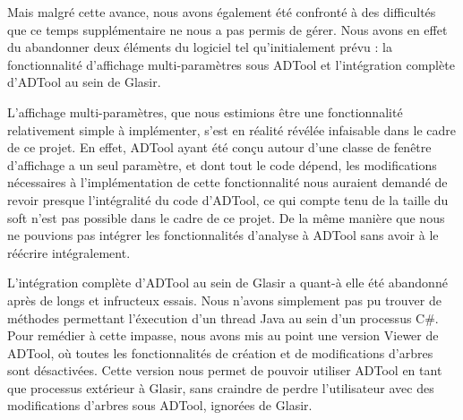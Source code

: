 Mais malgré cette avance, nous avons également été confronté à des difficultés que ce temps supplémentaire ne nous a pas permis de gérer. Nous avons en effet du abandonner deux éléments du logiciel tel qu'initialement prévu : la fonctionnalité d'affichage multi-paramètres sous ADTool et l'intégration complète d'ADTool au sein de Glasir.

L'affichage multi-paramètres, que nous estimions être une fonctionnalité relativement simple à implémenter, s'est en réalité révélée infaisable dans le cadre de ce projet. En effet, ADTool ayant été conçu autour d'une classe de fenêtre d'affichage a un seul paramètre, et dont tout le code dépend, les modifications nécessaires à l'implémentation de cette fonctionnalité nous auraient demandé de revoir presque l'intégralité du code d'ADTool, ce qui compte tenu de la taille du soft n'est pas possible dans le cadre de ce projet. De la même manière que nous ne pouvions pas intégrer les fonctionnalités d'analyse à ADTool sans avoir à le réécrire intégralement.

L'intégration complète d'ADTool au sein de Glasir a quant-à elle été abandonné après de longs et infructeux essais. Nous n'avons simplement pas pu trouver de méthodes permettant l'éxecution d'un thread Java au sein d'un processus C\#. Pour remédier à cette impasse, nous avons mis au point une version \og Viewer \fg de ADTool, où toutes les fonctionnalités de création et de modifications d'arbres sont désactivées. Cette version nous permet de pouvoir utiliser ADTool en tant que processus extérieur à Glasir, sans craindre de perdre l'utilisateur avec des modifications d'arbres sous ADTool, ignorées de Glasir.  

